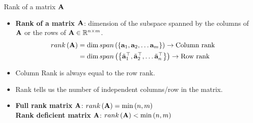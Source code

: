\documentclass[aspectratio=169]{beamer}
\let\olditem\item
\renewcommand{\item}{\setlength{\itemsep}{\fill}\olditem}
\def\mf{\ensuremath\mathbf}
\def\mb{\ensuremath\mathbb}
\def\lp{\ensuremath\left(}
\def\rp{\ensuremath\right)}
\def\lc{\ensuremath\left\{}
\def\rc{\ensuremath\right\}}
\begin{document}
\begin{frame}
\end{frame}


\begin{frame}[t]{Rank of a matrix $\mf{A}$}
\begin{itemize}
\item \textbf{Rank of a matrix $\mf{A}$}: dimension of the subspace spanned by the columns of $\mf{A}$ or the rows of $\mf{A} \in \mb{R}^{n \times m}$. 
\[ \begin{split} 
rank\lp \mf{A} \rp &= \mathrm{dim} \, span\lp \lc \mf{a}_1, \mf{a}_2, \ldots \mf{a}_m \rc \rp \rightarrow \text{Column rank}\\ 
&= \mathrm{dim} \, span\lp \lc \tilde{\mf{a}}_1^\top, \tilde{\mf{a}}_2^\top, \ldots \tilde{\mf{a}}_n^\top \rc \rp \rightarrow \text{Row rank}
\end{split}
\]

\item Column Rank is always equal to the row rank.

\item Rank tells us the number of independent columns/row in the matrix.

\item \textbf{Full rank matrix } $\mf{A}$: $rank\lp \mf{A} \rp  = \min\lp n, m\rp$\\
      \textbf{Rank deficient matrix } $\mf{A}$: $rank\lp \mf{A} \rp  < \min\lp n, m\rp$
\end{itemize}
\end{frame}
\end{document}
